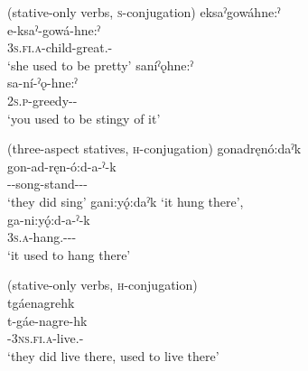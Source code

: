 \ea\label{ex:statvarex3}  (stative-only verbs, \textsc{s}-conjugation)
\ea eksaˀgowáhne:ˀ\\
\gll e-ksaˀ-gowá-hne:ˀ\\
 \textsc{3s.fi.a}-child-great.{\stative}-{\remote}\\
\glt `she used to be pretty'
\newpage
{}
\ex saníˀǫhne:ˀ\\
\gll sa-ní-ˀǫ-hne:ˀ\\
 \textsc{2s.p}-greedy-{\stative}-{\remote}\\
\glt `you used to be stingy of it'
\z
\z

\ea\label{ex:statvarex4}  (three-aspect statives, \textsc{h}-conjugation)
\ea gonadręnó:daˀk\\
\gll gon-ad-ręn-ó:d-a-ˀ-k\\
 -{\semireflexive}-song-stand-{\joinerA}-{\causative}-{\former}\\
\glt `they did sing'
\ex gani:yǫ́:daˀk ‘it hung there’,\\
\gll ga-ni:yǫ́:d-a-ˀ-k\\
 \textsc{3s.a}-hang.{\stative}-{\joinerA}-{\causative}-{\former}\\
\glt `it used to hang there'
\z
\z


\ea\label{ex:statvarex20}  (stative-only verbs, \textsc{h}-conjugation)\\
tgáenagrehk\\
\gll t-gáe-nagre-hk\\
 {\cislocative}-\textsc{3ns.fi.a}-live.{\stative}-{\former}\\
\glt `they did live there, used to live there'
\z 

